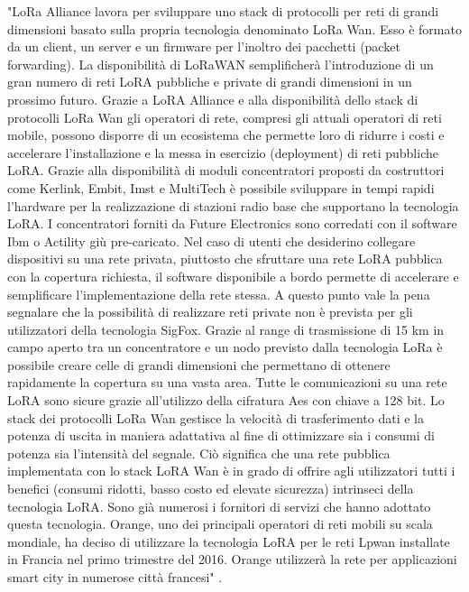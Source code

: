 \documentclass[a4paper]{report} %
\begin{document}
"LoRa Alliance lavora per sviluppare uno stack di protocolli per reti di grandi dimensioni basato sulla propria tecnologia denominato LoRa Wan. Esso è formato da un client, un server e un firmware per l'inoltro dei pacchetti (packet forwarding). La disponibilità di LoRaWAN semplificherà l'introduzione di un gran numero di reti LoRA pubbliche e private di grandi dimensioni in un prossimo futuro. Grazie a LoRA Alliance e alla disponibilità dello stack di protocolli LoRa Wan gli operatori di rete, compresi gli attuali operatori di reti mobile, possono disporre di un ecosistema che permette loro di ridurre i costi e accelerare l'installazione e la messa in esercizio (deployment) di reti pubbliche LoRA. Grazie alla disponibilità di moduli concentratori proposti da costruttori come Kerlink, Embit, Imst e MultiTech è possibile sviluppare in tempi rapidi l'hardware per la realizzazione di stazioni radio base che supportano la tecnologia LoRA. I concentratori forniti da Future Electronics sono corredati con il software Ibm o Actility giù pre-caricato. Nel caso di utenti che desiderino collegare dispositivi su una rete privata, piuttosto che sfruttare una rete LoRA pubblica con la copertura richiesta, il software disponibile a bordo permette di accelerare e semplificare l'implementazione della rete stessa. A questo punto vale la pena segnalare che la possibilità di realizzare reti private non è prevista per gli utilizzatori della tecnologia SigFox. Grazie al range di trasmissione di 15 km in campo aperto tra un concentratore e un nodo previsto dalla tecnologia LoRa è possibile creare celle di grandi dimensioni che permettano di ottenere rapidamente la copertura su una vasta area. Tutte le comunicazioni su una rete LoRA sono sicure grazie all'utilizzo della cifratura Aes con chiave a 128 bit. Lo stack dei protocolli LoRa Wan gestisce la velocità di trasferimento dati e la potenza di uscita in maniera adattativa al fine di ottimizzare sia i consumi di potenza sia l'intensità del segnale. Ciò significa che una rete pubblica implementata con lo stack LoRA Wan è in grado di offrire agli utilizzatori tutti i benefici (consumi ridotti, basso costo ed elevate sicurezza) intrinseci della tecnologia LoRA. Sono già numerosi i fornitori di servizi che hanno adottato questa tecnologia. Orange, uno dei principali operatori di reti mobili su scala mondiale, ha deciso di utilizzare la tecnologia LoRA per le reti Lpwan installate in Francia nel primo trimestre del 2016. Orange utilizzerà la rete per applicazioni smart city in numerose città francesi" \cite{art:rif.23}.
\end{document}

